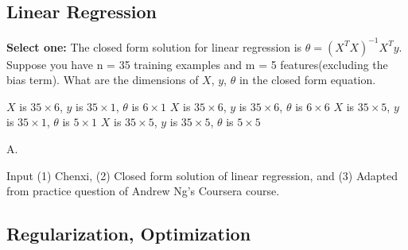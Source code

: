 \newpage
\subsection{Linear Regression}
\begin{questions}

\question[1] \textbf{Select one:} The closed form solution for linear regression is $\theta = (X^TX)^{-1}X^Ty$. Suppose you have n = 35 training examples and m = 5 features(excluding the bias term). What are the dimensions of $X$, $y$, $\theta$ in the closed form equation.
    \begin{checkboxes}
     \choice $X$ is $35\times6$, $y$ is $35\times1$, $\theta$ is $6\times1$
     \choice $X$ is $35\times6$, $y$ is $35\times6$, $\theta$ is $6\times6$
     \choice $X$ is $35\times5$, $y$ is $35\times1$, $\theta$ is $5\times1$
     \choice $X$ is $35\times5$, $y$ is $35\times5$, $\theta$ is $5\times5$
    \end{checkboxes}
    \begin{soln}
    A.
    \end{soln}
    \begin{qauthor}
    Input (1) Chenxi, (2) Closed form solution of linear regression, and (3) Adapted from practice question of Andrew Ng's Coursera course.
    \end{qauthor}
    
    
   

\end{questions}

\newpage
\subsection{Regularization, Optimization}

